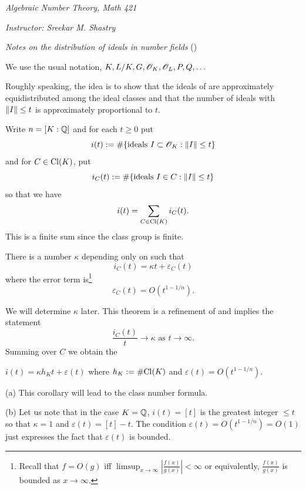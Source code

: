 \documentclass[10pt,a4paper,reqno]{amsart}
\begin{document}


\noindent \textit{Algebraic Number Theory, Math 421}

\noindent \textit{Instructor: Sreekar M. Shastry}

\noindent \emph{Notes on the distribution of ideals in number fields} (\cite[Ch.6]{M})

\bigskip
We use the usual notation, $K, L/K, G, \mathscr{O}_K, \mathscr{O}_L, P, Q, \dots$

\bigskip

\begin{ap}
Roughly speaking, the idea is to show that the ideals of \OK{} are
approximately equidistributed among the ideal classes and that the number of
ideals with $\| I\| \le t$ is approximately proportional to $t$.
\end{ap}

\begin{defn}
Write $n = [K:\mathbb{Q}]$ and for each $t \ge 0$ put \[i(t) := \# \{\text{ideals } I
\subset \mathscr{O}_K : \| I\| \le t\}\] and for $C\in \mathrm{Cl}(K)$, put \[i_C(t) := \#
\{\text{ideals } I \in C : \| I\| \le t\}\] so that we have \[i(t) =
\sum_{C\in\mathrm{Cl}(K)} i_C(t).\] This is a finite sum since the class group is
finite.
\end{defn}

\begin{thm}
There is a number $\kappa$ depending only on \OK{} such that \[i_C(t) = \kappa
t + \varepsilon_C(t)\] where the error term is\footnote{Recall that $f = O(g)$
iff $\limsup_{x\rightarrow \infty} \left|\frac{f(x)}{g(x)}\right| < \infty$
or equivalently, $\frac{f(x)}{g(x)}$ is bounded as $x\rightarrow \infty$.}
\[\varepsilon_C(t) = O(t^{1-1/n}).\]
\end{thm}

\begin{rem}
We will determine $\kappa$ later. This theorem is a refinement of and implies
the statement \[\frac{i_C(t)}{t} \rightarrow \kappa \text{ as } t \rightarrow
\infty.\] Summing over $C$ we obtain the
\end{rem}

\begin{cor}
$i(t) = \kappa h_K t + \varepsilon(t)$ where $h_K := \# \mathrm{Cl}(K)$ and
$\varepsilon(t) = O(t^{1-1/n}).$
\end{cor}

\begin{rems}
(a) This corollary will lead to the class number formula.

(b) Let us note that in the case $K=\mathbb{Q}$, $i(t) = [t]$ is the greatest integer
$\le t$ so that $\kappa=1$ and $\varepsilon(t) = [t]-t$. The condition
$\varepsilon(t) = O(t^{1-1/n}) = O(1)$ just expresses the fact that
$\varepsilon(t)$ is bounded.
\end{rems}
\end{document}
